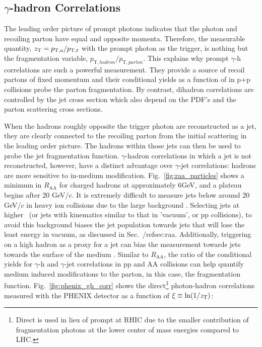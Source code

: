 \subsection{$\gamma$-hadron Correlations}
\label{sec:intro_gh}
The leading order picture of prompt photons indicates that the photon and recoiling parton have equal and opposite momenta. Therefore, the measurable quantity, $z_{\mathrm{T}} = p_{\mathrm{T},a}/p_{\mathrm{T},t}$ with the prompt photon as the trigger,  is nothing but the fragmentation variable, $p_{\mathrm{T},hadron}/p_{\mathrm{T},parton}$. This explains why prompt $\gamma$-h correlations are such a powerful measurement. They provide a source of recoil partons of fixed momentum and their conditional yields as a function of \zt in p+p collisions probe the parton fragmentation. By contrast, dihadron correlations are controlled by the jet cross section which also depend on the PDF’s and the parton scattering cross sections. 

When the hadrons roughly opposite the trigger photon are reconstructed as a jet, they are clearly connected to the recoiling parton from the initial scattering in the leading order picture. The hadrons within those jets can then be used to probe the jet fragmentation function. $\gamma$-hadron correlations in which a jet is not reconstructed, however, have a distinct advantage over $\gamma$-jet correlations: hadrons are more sensitive to in-medium modification. Fig.~\ref{fig:raa_particles} shows a minimum in $R_\mathrm{AA}$ for charged hadrons at approximately 6GeV, and a plateau begins after 20 GeV$/c$. It is extremely difficult to measure jets below around 20 GeV/$c$ in heavy ion collisions due to the large background \cite{STARCollaboration2017}. Selecting jets at higher \pt~(or jets with kinematics similar to that in 'vacuum', or pp collisions), to avoid this background biases the jet population towards jets that will lose the least energy in vacuum, as discussed in Sec.~/ref{sec:raa}. Additionally, triggering on a high \pt hadron as a proxy for a jet can bias the measurement towards jets towards the surface of the medium \cite{Zhang2007}. Similar to $R_\mathrm{AA}$, the ratio of the conditional yields for $\gamma$-h and $\gamma$-jet correlations in pp and AA collisions can help quantify medium induced modifications to the parton, in this case, the fragmentation function. Fig.~\ref{fig:phenix_gh_corr} shows the direct\footnote{Direct is used in lieu of prompt at RHIC due to the smaller contribution of fragmentation photons at the lower center of mass energies compared to LHC.} photon-hadron correlations measured with the PHENIX detector as a function of $\xi\equiv\ln(1/z_{\mathrm{T}})$:

